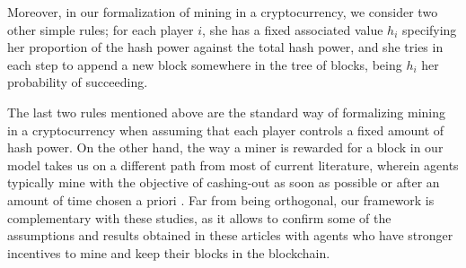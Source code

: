 %
Moreover, in our formalization of mining in a cryptocurrency,
we consider two other simple rules; for each player $i$, she 
has a fixed associated value $h_i$ specifying her proportion of the hash power 
against the total hash power, and  
she tries in each step to append a new block somewhere in the tree of blocks, being 
$h_i$ her probability of succeeding. 

The last two rules mentioned above 
are the standard way of 
formalizing mining in a cryptocurrency 
when assuming that each player controls a fixed amount of hash power. On the other hand, the way a miner is rewarded for a block in our model
takes us on a different path from most of current literature, wherein agents typically mine 
with the objective of cashing-out as soon as possible or after an  amount of time chosen a priori   \cite{mininggames:2016,biais2018blockchain}. Far from being orthogonal, our framework is complementary with these studies, as it allows to confirm some of the assumptions and results obtained in these articles with agents who have stronger incentives to mine and keep their blocks in the blockchain.

